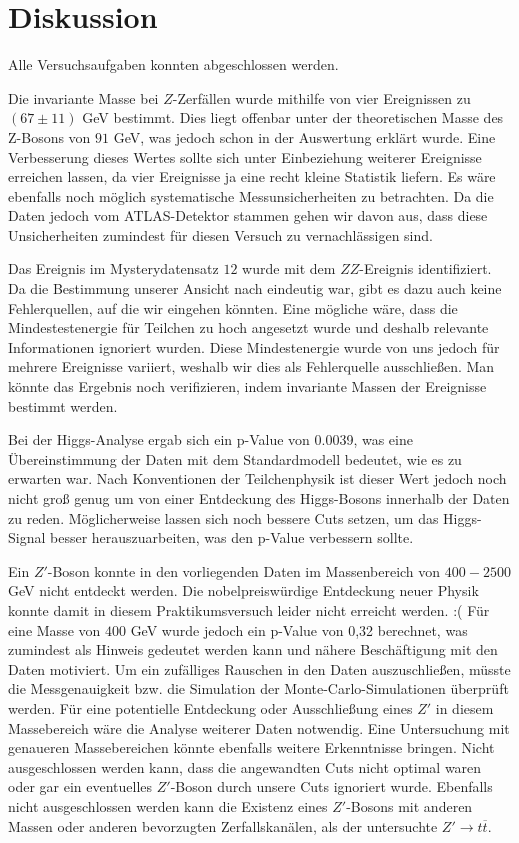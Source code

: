 \section{Diskussion}

Alle Versuchsaufgaben konnten abgeschlossen werden.

Die invariante Masse bei $Z$-Zerfällen wurde mithilfe von vier Ereignissen zu $(67 \pm 11)$ GeV bestimmt.
Dies liegt offenbar unter der theoretischen Masse des Z-Bosons von $91$ GeV, was jedoch schon in der Auswertung erklärt wurde.
Eine Verbesserung dieses Wertes sollte sich unter Einbeziehung weiterer Ereignisse erreichen lassen, da vier Ereignisse ja eine recht kleine Statistik liefern.
Es wäre ebenfalls noch möglich systematische Messunsicherheiten zu betrachten. 
Da die Daten jedoch vom ATLAS-Detektor stammen gehen wir davon aus, dass diese Unsicherheiten zumindest für diesen Versuch zu vernachlässigen sind.

Das Ereignis im Mysterydatensatz $12$ wurde mit dem $ZZ$-Ereignis identifiziert.
Da die Bestimmung unserer Ansicht nach eindeutig war, gibt es dazu auch keine Fehlerquellen, auf die wir eingehen könnten.
Eine mögliche wäre, dass die Mindestestenergie für Teilchen zu hoch angesetzt wurde und deshalb relevante Informationen ignoriert wurden.
Diese Mindestenergie wurde von uns jedoch für mehrere Ereignisse variiert, weshalb wir dies als Fehlerquelle ausschließen.
Man könnte das Ergebnis noch verifizieren, indem invariante Massen der Ereignisse bestimmt werden.

Bei der Higgs-Analyse ergab sich ein p-Value von 0.0039, was eine Übereinstimmung der Daten mit dem Standardmodell bedeutet, wie es zu erwarten war.
Nach Konventionen der Teilchenphysik ist dieser Wert jedoch noch nicht groß genug um von einer Entdeckung des Higgs-Bosons innerhalb der Daten zu reden.
Möglicherweise lassen sich noch bessere Cuts setzen, um das Higgs-Signal besser herauszuarbeiten, was den p-Value verbessern sollte.

Ein $Z'$-Boson konnte in den vorliegenden Daten im Massenbereich von $400-2500$ GeV nicht entdeckt werden.
Die nobelpreiswürdige Entdeckung neuer Physik konnte damit in diesem Praktikumsversuch leider nicht erreicht werden. :(
Für eine Masse von $400$ GeV wurde jedoch ein p-Value von 0,32 berechnet, was zumindest als Hinweis gedeutet werden kann und nähere Beschäftigung mit den Daten motiviert.
Um ein zufälliges Rauschen in den Daten auszuschließen, müsste die Messgenauigkeit bzw. die Simulation der Monte-Carlo-Simulationen überprüft werden.
Für eine potentielle Entdeckung oder Ausschließung eines $Z'$ in diesem Massebereich wäre die Analyse weiterer Daten notwendig.
Eine Untersuchung mit genaueren Massebereichen könnte ebenfalls weitere Erkenntnisse bringen.
Nicht ausgeschlossen werden kann, dass die angewandten Cuts nicht optimal waren oder gar ein eventuelles $Z'$-Boson durch unsere Cuts ignoriert wurde.
Ebenfalls nicht ausgeschlossen werden kann die Existenz eines $Z'$-Bosons mit anderen Massen oder anderen bevorzugten Zerfallskanälen, als der untersuchte $Z' \rightarrow t\overline{t}$.